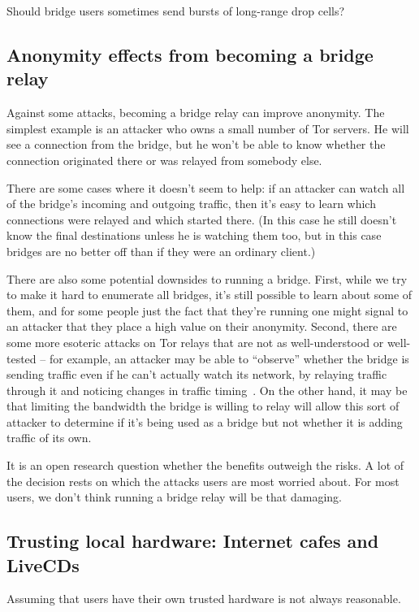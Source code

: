 \documentclass{llncs}
\begin{document}
Should bridge users sometimes send bursts of long-range drop cells?


\subsection{Anonymity effects from becoming a bridge relay}

Against some attacks, becoming a bridge relay can improve anonymity. The
simplest example is an attacker who owns a small number of Tor servers. He
will see a connection from the bridge, but he won't be able to know
whether the connection originated there or was relayed from somebody else.

There are some cases where it doesn't seem to help: if an attacker can
watch all of the bridge's incoming and outgoing traffic, then it's easy
to learn which connections were relayed and which started there. (In this
case he still doesn't know the final destinations unless he is watching
them too, but in this case bridges are no better off than if they were
an ordinary client.)

There are also some potential downsides to running a bridge. First, while
we try to make it hard to enumerate all bridges, it's still possible to
learn about some of them, and for some people just the fact that they're
running one might signal to an attacker that they place a high value
on their anonymity. Second, there are some more esoteric attacks on Tor
relays that are not as well-understood or well-tested -- for example, an
attacker may be able to ``observe'' whether the bridge is sending traffic
even if he can't actually watch its network, by relaying traffic through
it and noticing changes in traffic timing~\cite{attack-tor-oak05}. On
the other hand, it may be that limiting the bandwidth the bridge is
willing to relay will allow this sort of attacker to determine if it's
being used as a bridge but not whether it is adding traffic of its own.

It is an open research question whether the benefits outweigh the risks. A
lot of the decision rests on which the attacks users are most worried
about. For most users, we don't think running a bridge relay will be
that damaging.

\subsection{Trusting local hardware: Internet cafes and LiveCDs}
\label{subsec:cafes-and-livecds}

Assuming that users have their own trusted hardware is not
always reasonable.
\end{document}
